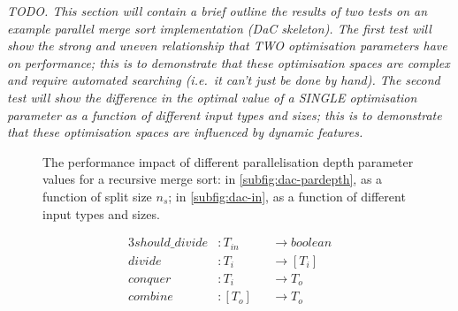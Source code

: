 \textit{TODO. This section will contain a brief outline the results of
two tests on an example parallel merge sort implementation (DaC
skeleton). The first test will show the strong and uneven relationship
that TWO optimisation parameters have on performance; this is to
demonstrate that these optimisation spaces are complex and require
automated searching (i.e.\ it can't just be done by hand). The second
test will show the difference in the optimal value of a SINGLE
optimisation parameter as a function of different input types and
sizes; this is to demonstrate that these optimisation spaces are
influenced by dynamic features.}

\begin{figure}[!b]
\centering

\caption{The performance impact of different parallelisation depth
  parameter values for a recursive merge sort: in
  \ref{subfig:dac-pardepth}, as a function of split size $n_s$; in
  \ref{subfig:dac-in}, as a function of different input types and
  sizes.}
\label{fig:dac}
\end{figure}

\begin{alignat*}{3}
should\_divide &: T_{in} & &\rightarrow boolean\\
divide &: T_i & &\rightarrow [T_i]\\
conquer &: T_i & &\rightarrow T_o\\
combine &: [T_o] & &\rightarrow T_o
\end{alignat*}



